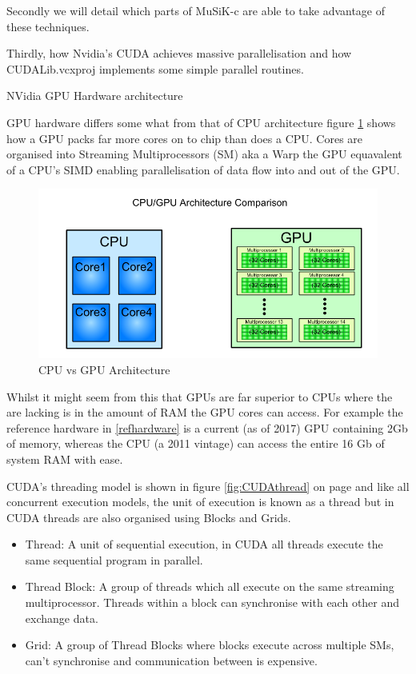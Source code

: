 \documentclass[a4paper]{amsart}
\begin{document}
Secondly we will detail which parts of MuSiK-c are able to take advantage of these techniques. 


Thirdly, how Nvidia's CUDA achieves massive parallelisation and how CUDALib.vcxproj implements some simple parallel routines.

NVidia GPU Hardware architecture

GPU hardware differs some what from that of CPU architecture figure \ref{fig:CPUGPU} shows how a GPU packs far more cores on to chip than does a CPU. Cores are organised into Streaming Multiprocessors (SM) aka a Warp the GPU equavalent of a CPU's SIMD enabling parallelisation of data flow into and out of the GPU.

\begin{figure}[h]
\centering
\includegraphics[scale=0.5]{cpu_vs_gpu-1.png}
\caption {CPU vs GPU Architecture}
\label {fig:CPUGPU}
\end{figure}

Whilst it might seem from this that GPUs are far superior to CPUs where the are lacking is in the amount of RAM the GPU cores can access. For example the reference hardware in \ref{refhardware} is a current (as of 2017) GPU containing 2Gb of memory, whereas the CPU (a 2011 vintage) can access the entire 16 Gb of system RAM with ease.

CUDA's threading model is shown in figure \ref{fig:CUDAthread} on page \pageref{fig:CUDAthread} and like all concurrent execution models, the unit of execution is known as a thread but in CUDA threads are also organised using Blocks and Grids.
\begin{itemize}
  \item Thread: A unit of sequential execution, in CUDA all threads execute the same sequential program in parallel.
  \item Thread Block: A group of threads which all execute on the same streaming multiprocessor. Threads within a block can synchronise with each other and exchange data.
  \item Grid: A group of Thread Blocks where blocks execute across multiple SMs, can't synchronise and communication between is expensive.
\end{itemize}
\end{document}
